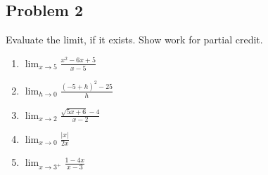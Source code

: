 \documentclass[10pt]{book}
\theoremstyle{definition}
\begin{document}
\subsection*{Problem 2} Evaluate the limit, if it exists. Show work for partial credit.
\begin{enumerate}[label=(\alph*)]
    \item $\displaystyle \lim_{x\rightarrow 5}\frac{x^2-6x+5}{x-5}$\vspace{3.75cm}
    \item $\displaystyle \lim_{h\rightarrow 0}\frac{(-5+h)^2-25}{h}$\vspace{3.75cm}
    \item $\displaystyle \lim_{x\rightarrow 2}\frac{\sqrt{5x+6}-4}{x-2}$\vspace{3.75cm}
    \item $\displaystyle \lim_{x\rightarrow 0}\frac{|x|}{2x}$\vspace{3.75cm}
    \item $\displaystyle \lim_{x\rightarrow 3^+}\frac{1-4x}{x-3}$
\end{enumerate}
\end{document}
